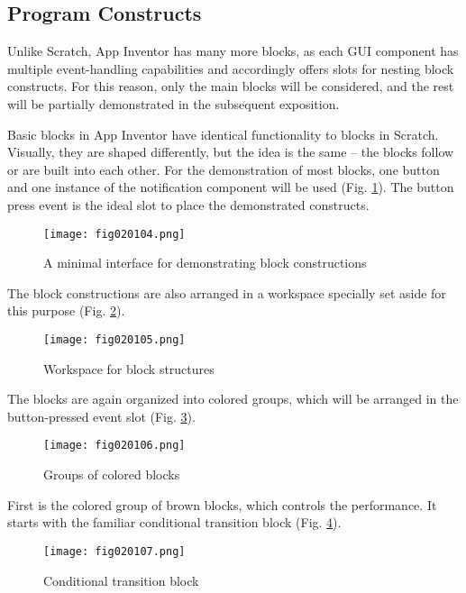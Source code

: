 \subsection{Program Constructs}

Unlike Scratch, App Inventor has many more blocks, as each GUI component has multiple event-handling capabilities and accordingly offers slots for nesting block constructs. For this reason, only the main blocks will be considered, and the rest will be partially demonstrated in the subsequent exposition.

Basic blocks in App Inventor have identical functionality to blocks in Scratch. Visually, they are shaped differently, but the idea is the same – the blocks follow or are built into each other. For the demonstration of most blocks, one button and one instance of the notification component will be used (Fig. \ref{fig020104}). The button press event is the ideal slot to place the demonstrated constructs.

\begin{figure}[H]
   \centering
   \texttt{[image: fig020104.png]}
   \caption{A minimal interface for demonstrating block constructions}
\label{fig020104}
\end{figure}

The block constructions are also arranged in a workspace specially set aside for this purpose (Fig. \ref{fig020105}).

\begin{figure}[H]
   \centering
   \texttt{[image: fig020105.png]}
   \caption{Workspace for block structures}
\label{fig020105}
\end{figure}

The blocks are again organized into colored groups, which will be arranged in the button-pressed event slot (Fig. \ref{fig020106}).

\begin{figure}[H]
   \centering
   \texttt{[image: fig020106.png]}
   \caption{Groups of colored blocks}
\label{fig020106}
\end{figure}

First is the colored group of brown blocks, which controls the performance. It starts with the familiar conditional transition block (Fig. \ref{fig020107}).

\begin{figure}[H]
   \centering
   \texttt{[image: fig020107.png]}
   \caption{Conditional transition block}
\label{fig020107}
\end{figure}

